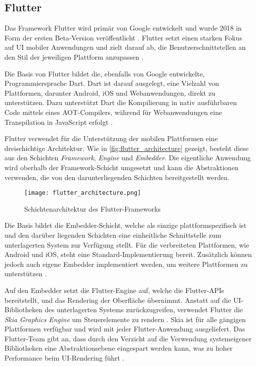 \subsection{Flutter}
\label{sec:frameworks_flutter}

Das Framework Flutter wird primär von Google entwickelt und wurde 2018 in Form der ersten Beta-Version veröffentlicht \cite{Sharma_Flutter}.
Flutter setzt einen starken Fokus auf \ac{UI} mobiler Anwendungen und zielt darauf ab, die Benutzerschnittstellen an den Stil der jeweiligen Plattform anzupassen \cite{Flutter_Architektur}.


Die Basis von Flutter bildet die, ebenfalls von Google entwickelte, Programmiersprache Dart.
Dart ist darauf ausgelegt, eine Vielzahl von Plattformen, darunter Android, iOS und Webanwendungen, direkt zu unterstützen.
Dazu unterstützt Dart die Kompilierung in nativ ausführbaren Code mittels eines \ac{AOT}-Compilers, während für Webanwendungen eine Transpilation in JavaScript erfolgt \cite{Flutter_Architektur,Dart_Overview}.


Flutter verwendet für die Unterstützung der mobilen Plattformen eine dreischichtige Architektur.
Wie in \autoref{fig:flutter_architecture} gezeigt, besteht diese aus den Schichten \textit{Framework}, \textit{Engine} und \textit{Embedder}.
Die eigentliche Anwendung wird oberhalb der Framework-Schicht umgesetzt und kann die Abstraktionen verwenden, die von den darunterliegenden Schichten bereitgestellt werden.
\begin{figure}[h]
    \centering
    \texttt{[image: flutter\_architecture.png]}
    \caption{Schichtenarchitektur des Flutter-Frameworks \cite{Flutter_Architektur}}
    \label{fig:flutter_architecture}
\end{figure}


Die Basis bildet die Embedder-Schicht, welche als einzige plattformspezifisch ist und den darüber liegenden Schichten eine einheitliche Schnittstelle zum unterlagerten System zur Verfügung stellt.
Für die verbreiteten Plattformen, wie Android und iOS, steht eine Standard-Implementierung bereit.
Zusätzlich können jedoch auch eigene Embedder implementiert werden, um weitere Plattformen zu unterstützen \cite{Flutter_Architektur}.


Auf den Embedder setzt die Flutter-Engine auf, welche die Flutter-\acp{API} bereitstellt, und das Rendering der Oberfläche übernimmt.
Anstatt auf die \ac{UI}-Bibliotheken des unterlagerten Systems zurückzugreifen, verwendet Flutter die \textit{Skia Graphics Engine} um Steuerelemente zu rendern \cite{Biorn-Hansen_PerformanceOverhead_CrossPlatform}.
Skia ist für alle gängigen Plattformen verfügbar und wird mit jeder Flutter-Anwendung ausgeliefert.
Das Flutter-Team gibt an, dass durch den Verzicht auf die Verwendung systemeigener Bibliotheken eine Abstraktionsebene eingespart werden kann, was zu hoher Performance beim \ac{UI}-Rendering führt \cite{Flutter_Architektur}.


